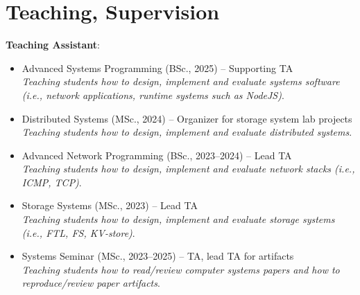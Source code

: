 \documentclass[letterpaper,11pt]{article}
\begin{document}
\section{Teaching, Supervision}
\textbf{Teaching Assistant}:
\begin{itemize}[label={}]
\itemsep0em
  \item Advanced Systems Programming (BSc., 2025) -- Supporting TA\\
  \textit{Teaching students how to design, implement and evaluate systems software (i.e., network applications, runtime systems such as NodeJS)}.

  \item Distributed Systems (MSc., 2024) -- Organizer for storage system lab projects\\
  \textit{Teaching students how to design, implement and evaluate distributed systems}.
  
  \item Advanced Network Programming (BSc., 2023--2024) -- Lead TA\\
  \textit{Teaching students how to design, implement and evaluate network stacks (i.e., ICMP, TCP)}.

  \item Storage Systems (MSc., 2023) -- Lead TA\\
  \textit{Teaching students how to design, implement and evaluate storage systems (i.e., FTL, FS, KV-store)}.

  \item Systems Seminar (MSc., 2023--2025) -- TA, lead TA for artifacts\\
  \textit{Teaching students how to read/review computer systems papers and how to reproduce/review paper artifacts}.
\end{itemize}
\end{document}
